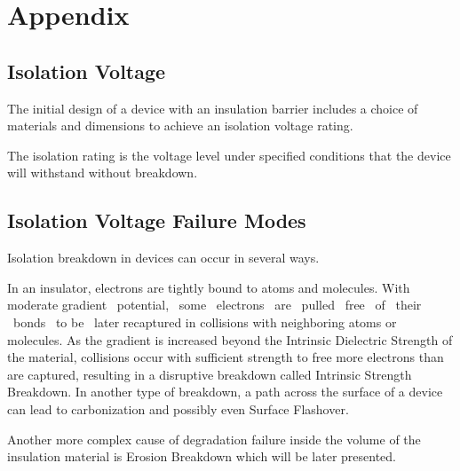 %
%

\chapter*{Appendix}
\setlength{\parskip}{1em}
\section*{Isolation Voltage}
The initial design of a device with an insulation barrier includes a choice of materials and dimensions to achieve an isolation voltage rating.

The isolation rating is the voltage level under specified conditions that the device will withstand without breakdown.

\section*{Isolation Voltage Failure Modes}
Isolation breakdown in devices can occur in several ways.

In an insulator, electrons are tightly bound to atoms and molecules. With moderate gradient ~potential, ~some ~electrons ~are ~pulled ~free ~of ~their ~bonds ~to be ~later recaptured in collisions with neighboring atoms or molecules. As the gradient is increased beyond the Intrinsic Dielectric Strength of the material, collisions occur with sufficient strength to free more electrons than are captured, resulting in a disruptive breakdown called Intrinsic Strength Breakdown. In another type of breakdown, a path across the surface of a device can lead to carbonization and possibly even Surface Flashover.

Another more complex cause of degradation failure inside the volume of the insulation material is Erosion Breakdown which will be later presented.

